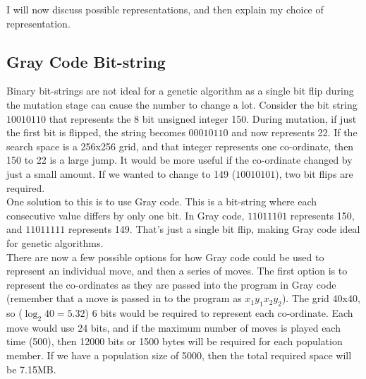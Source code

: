 \documentclass[]{report}
\begin{document}
I will now discuss possible representations, and then explain my choice of representation.

\subsection{Gray Code Bit-string}

Binary bit-strings are not ideal for a genetic algorithm as a single bit flip during the mutation stage can cause the number to change a lot. Consider the bit string $10010110$ that represents the 8 bit unsigned integer 150. During mutation, if just the first bit is flipped, the string becomes $00010110$ and now represents 22. If the search space is a 256x256 grid, and that integer represents one co-ordinate, then 150 to 22 is a large jump. It would be more useful if the co-ordinate changed by just a small amount. If we wanted to change to 149 ($10010101$), two bit flips are required. \\

One solution to this is to use Gray code. This is a bit-string where each consecutive value differs by only one bit. In Gray code, $11011101$ represents 150, and $11011111$ represents 149. That's just a single bit flip, making Gray code ideal for genetic algorithms. \\

There are now a few possible options for how Gray code could be used to represent an individual move, and then a series of moves. The first option is to represent the co-ordinates as they are passed into the program in Gray code (remember that a move is passed in to the program as $x_1 y_1 x_2 y_2$). The grid 40x40, so ($\log _2 40 = 5.32$) 6 bits would be required to represent each co-ordinate. Each move would use 24 bits, and if the maximum number of moves is played each time (500), then 12000 bits or 1500 bytes will be required for each population member. If we have a population size of 5000, then the total required space will be 7.15MB.  \\
\end{document}
